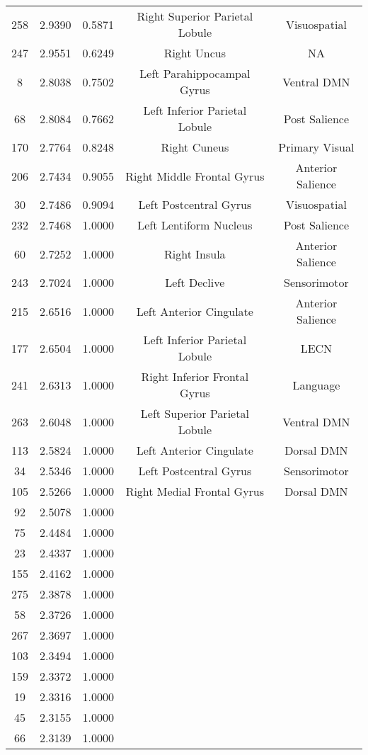 \documentclass[12pt]{article}\usepackage[]{graphicx}\usepackage[]{color}
\begin{document}
\begin{longtable}[c]{ccccc}
	258	& 2.9390 & 0.5871 & Right Superior Parietal Lobule & Visuospatial \\
	247	& 2.9551 & 0.6249 & Right Uncus & NA \\
	8	& 2.8038 & 0.7502 & Left Parahippocampal Gyrus & Ventral DMN \\
	68	& 2.8084 & 0.7662 & Left Inferior Parietal Lobule & Post Salience \\
	170	& 2.7764 & 0.8248 & Right Cuneus & Primary Visual \\
	206	& 2.7434 & 0.9055 & Right Middle Frontal Gyrus & Anterior Salience \\
	30	& 2.7486 & 0.9094 & Left Postcentral Gyrus & Visuospatial \\
	232	& 2.7468 & 1.0000 & Left Lentiform Nucleus & Post Salience \\      
	60	& 2.7252 & 1.0000 & Right Insula & Anterior Salience \\
	243	& 2.7024 & 1.0000 & Left Declive & Sensorimotor \\
	215	& 2.6516 & 1.0000 & Left Anterior Cingulate & Anterior Salience \\
	177	& 2.6504 & 1.0000 & Left Inferior Parietal Lobule & LECN \\
	241	& 2.6313 & 1.0000 & Right Inferior Frontal Gyrus & Language \\
	263	& 2.6048 & 1.0000 & Left Superior Parietal Lobule & Ventral DMN \\
	113	& 2.5824 & 1.0000 & Left Anterior Cingulate & Dorsal DMN \\
	34	& 2.5346 & 1.0000 & Left Postcentral Gyrus & Sensorimotor \\
	105	& 2.5266 & 1.0000 & Right Medial Frontal Gyrus & Dorsal DMN \\
	92	& 2.5078 & 1.0000 & & \\
	75	& 2.4484 & 1.0000 & & \\
	23	& 2.4337 & 1.0000 & & \\
	155	& 2.4162 & 1.0000 & & \\
	275	& 2.3878 & 1.0000 & & \\
	58	& 2.3726 & 1.0000 & & \\
	267	& 2.3697 & 1.0000 & & \\
	103	& 2.3494 & 1.0000 & & \\
	159	& 2.3372 & 1.0000 & & \\
	19	& 2.3316 & 1.0000 & & \\
	45	& 2.3155 & 1.0000 & & \\
	66	& 2.3139 & 1.0000 & & \\

\end{longtable}
\end{document}
